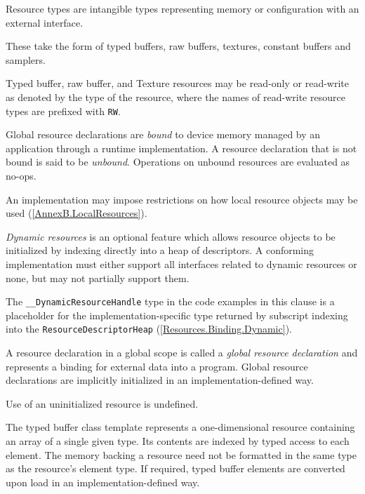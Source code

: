 
\p Resource types are intangible types representing memory or configuration with
an external interface.

\p These take the form of typed buffers, raw buffers, textures, constant buffers
and samplers.

\p Typed buffer, raw buffer, and Texture resources may be read-only or
read-write as denoted by the type of the resource, where the names of read-write
resource types are prefixed with \texttt{RW}.

\p Global resource declarations are \textit{bound} to device memory managed by
an application through a runtime implementation. A resource declaration that is
not bound is said to be \textit{unbound}. Operations on unbound resources are
evaluated as no-ops.

\p An implementation may impose restrictions on how local resource objects may
be used (\ref{AnnexB.LocalResources}).


\p \textit{Dynamic resources} is an optional feature which allows resource
objects to be initialized by indexing directly into a heap of descriptors. A
conforming implementation must either support all interfaces related to dynamic
resources or none, but may not partially support them.

\p The \texttt{\_\_DynamicResourceHandle} type in the code examples in this
clause is a placeholder for the implementation-specific type returned by
subscript indexing into the \texttt{ResourceDescriptorHeap}
(\ref{Resources.Binding.Dynamic}).



\p A resource declaration in a global scope is called a \textit{global
resource declaration} and represents a binding for external data into a
program. Global resource declarations are implicitly initialized in an
implementation-defined way.

\p Use of an uninitialized resource is undefined.


\p The typed buffer class template represents a one-dimensional resource
containing an array of a single given type. Its contents are indexed by typed
access to each element. The memory backing a resource need not be formatted in the
same type as the resource's element type. If required, typed buffer elements are
converted upon load in an implementation-defined way.

